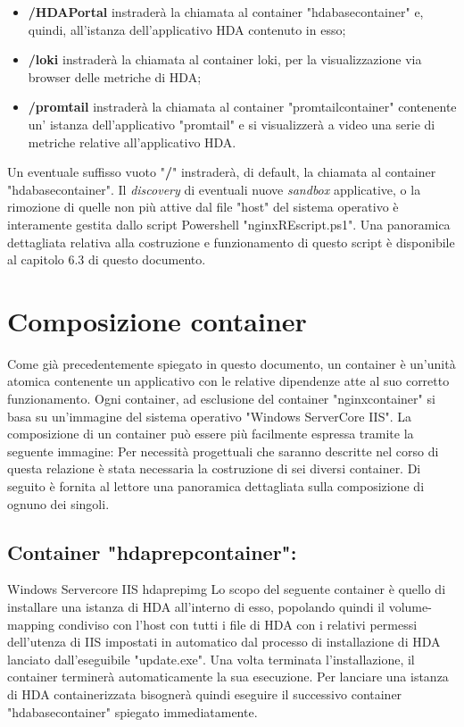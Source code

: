 \begin{itemize}
	\item \textbf{/HDAPortal} instraderà la chiamata al container "hdabasecontainer" e, quindi, all'istanza dell'applicativo HDA contenuto in esso;
	\item \textbf{/loki} instraderà la chiamata al container loki, per la visualizzazione via browser delle metriche di HDA;
	\item \textbf{/promtail} instraderà la chiamata al container "promtailcontainer" contenente un' istanza dell'applicativo "promtail" e si visualizzerà a video una serie di metriche relative all'applicativo HDA.
\end{itemize}
Un eventuale suffisso vuoto "\textbf{/}" instraderà, di default, la chiamata al container "hdabasecontainer".
Il \textit{discovery} di eventuali nuove \textit{sandbox} applicative, o la rimozione di quelle non più attive dal file "host" del sistema operativo è interamente gestita dallo script Powershell "nginxREscript.ps1". Una panoramica dettagliata relativa alla costruzione e funzionamento di questo script è disponibile al capitolo 6.3 di questo documento.

\section{Composizione container}
Come già precedentemente spiegato in questo documento, un container è un'unità atomica contenente un applicativo con le relative dipendenze atte al suo corretto funzionamento. Ogni container, ad esclusione del container "nginxcontainer" si basa su un'immagine del sistema operativo "Windows ServerCore IIS".
La composizione di un container può essere più facilmente espressa tramite la seguente immagine:
Per necessità progettuali che saranno descritte nel corso di questa relazione è stata necessaria la costruzione di sei diversi container. Di seguito è fornita al lettore una panoramica dettagliata sulla composizione di ognuno dei singoli.\\

\subsection{Container "hdaprepcontainer":}

\begin{namespacedesc}
	 {Windows Servercore IIS}
	 {hdaprepimg}
	 {Lo scopo del seguente container è quello di installare una istanza di HDA all'interno di esso, popolando quindi il volume-mapping condiviso con l'host con tutti i file di HDA con i relativi permessi dell'utenza di IIS impostati in automatico dal processo di installazione di HDA lanciato dall'eseguibile "update.exe".
Una volta terminata l'installazione, il container terminerà automaticamente la sua esecuzione. Per lanciare una istanza di HDA containerizzata bisognerà quindi eseguire il successivo container "hdabasecontainer" spiegato immediatamente.}
\end{namespacedesc}
